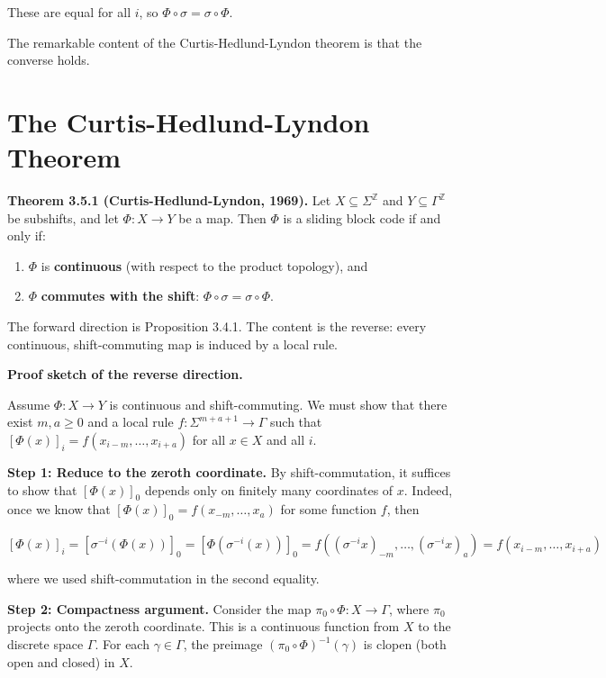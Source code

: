 These are equal for all $i$, so $\Phi \circ \sigma = \sigma \circ \Phi$. 

The remarkable content of the Curtis-Hedlund-Lyndon theorem is that the converse holds.



\section{The Curtis-Hedlund-Lyndon Theorem}

\textbf{Theorem 3.5.1 (Curtis-Hedlund-Lyndon, 1969).} Let $X \subseteq \Sigma^\mathbb{Z}$ and $Y \subseteq \Gamma^\mathbb{Z}$ be subshifts, and let $\Phi: X \to Y$ be a map. Then $\Phi$ is a sliding block code if and only if:

\begin{enumerate}
\item $\Phi$ is \textbf{continuous} (with respect to the product topology), and
\item $\Phi$ \textbf{commutes with the shift}: $\Phi \circ \sigma = \sigma \circ \Phi$.
\end{enumerate}

The forward direction is Proposition 3.4.1. The content is the reverse: every continuous, shift-commuting map is induced by a local rule.

\textbf{Proof sketch of the reverse direction.}

Assume $\Phi: X \to Y$ is continuous and shift-commuting. We must show that there exist $m, a \geq 0$ and a local rule $f: \Sigma^{m+a+1} \to \Gamma$ such that $[\Phi(x)]_i = f(x_{i-m}, \ldots, x_{i+a})$ for all $x \in X$ and all $i$.

\textbf{Step 1: Reduce to the zeroth coordinate.} By shift-commutation, it suffices to show that $[\Phi(x)]_0$ depends only on finitely many coordinates of $x$. Indeed, once we know that $[\Phi(x)]_0 = f(x_{-m}, \ldots, x_a)$ for some function $f$, then

\[[\Phi(x)]_i = [\sigma^{-i}(\Phi(x))]_0 = [\Phi(\sigma^{-i}(x))]_0 = f((\sigma^{-i} x)_{-m}, \ldots, (\sigma^{-i} x)_a) = f(x_{i-m}, \ldots, x_{i+a})\]

where we used shift-commutation in the second equality.

\textbf{Step 2: Compactness argument.} Consider the map $\pi_0 \circ \Phi: X \to \Gamma$, where $\pi_0$ projects onto the zeroth coordinate. This is a continuous function from $X$ to the discrete space $\Gamma$. For each $\gamma \in \Gamma$, the preimage $(\pi_0 \circ \Phi)^{-1}(\gamma)$ is clopen (both open and closed) in $X$.

